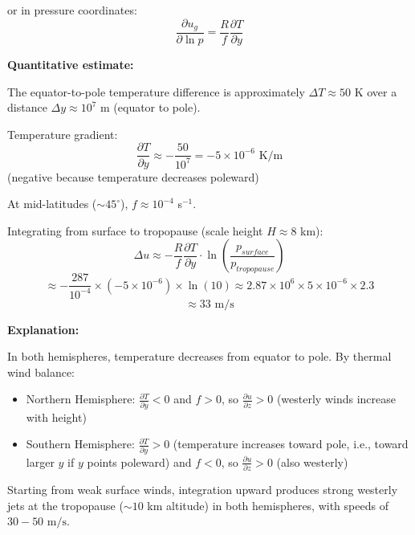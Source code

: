 \documentclass[letterpaper, 11pt]{article}
\newcommand{\1}{\mathds{1}}	%
\theoremstyle{definition}
\begin{document}
or in pressure coordinates:
\[
\frac{\partial u_g}{\partial \ln p} = \frac{R}{f}\frac{\partial T}{\partial y}
\]

\textbf{Quantitative estimate:}

The equator-to-pole temperature difference is approximately $\Delta T \approx 50$ K over a distance $\Delta y \approx 10^7$ m (equator to pole).

Temperature gradient:
\[
\frac{\partial T}{\partial y} \approx -\frac{50}{10^7} = -5 \times 10^{-6} \text{ K/m}
\]
(negative because temperature decreases poleward)

At mid-latitudes ($\sim 45^\circ$), $f \approx 10^{-4}$ s$^{-1}$.

Integrating from surface to tropopause (scale height $H \approx 8$ km):
\[
\Delta u \approx -\frac{R}{f}\frac{\partial T}{\partial y} \cdot \ln\left(\frac{p_{surface}}{p_{tropopause}}\right)
\]
\[
\approx -\frac{287}{10^{-4}} \times (-5 \times 10^{-6}) \times \ln(10) \approx 2.87 \times 10^6 \times 5 \times 10^{-6} \times 2.3
\]
\[
\approx 33 \text{ m/s}
\]

\textbf{Explanation:}

In both hemispheres, temperature decreases from equator to pole. By thermal wind balance:
\begin{itemize}
\item Northern Hemisphere: $\frac{\partial T}{\partial y} < 0$ and $f > 0$, so $\frac{\partial u}{\partial z} > 0$ (westerly winds increase with height)
\item Southern Hemisphere: $\frac{\partial T}{\partial y} > 0$ (temperature increases toward pole, i.e., toward larger $y$ if $y$ points poleward) and $f < 0$, so $\frac{\partial u}{\partial z} > 0$ (also westerly)
\end{itemize}

Starting from weak surface winds, integration upward produces strong westerly jets at the tropopause ($\sim 10$ km altitude) in both hemispheres, with speeds of $\boxed{30-50 \text{ m/s}}$.
\end{document}
